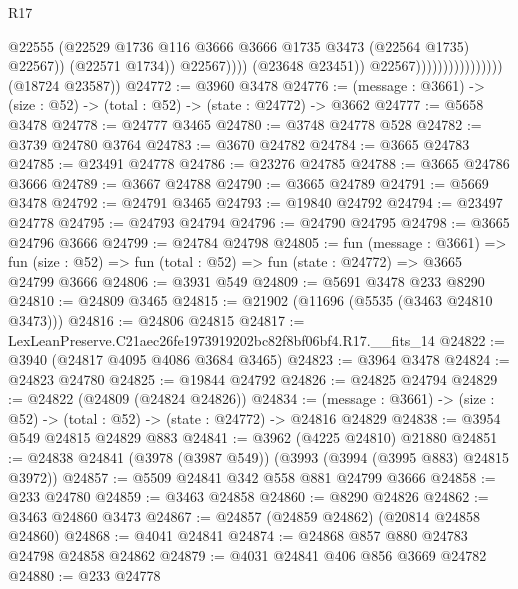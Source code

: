\begin{lexlean}{R17}
\begin{coremodule}
                                                    @22555
                                                    (@22529
                                                      @1736
                                                      @116
                                                      @3666
                                                      @3666
                                                      @1735
                                                      @3473
                                                      (@22564 @1735)
                                                      @22567))
                                                  (@22571 @1734))
                                                @22567))))
                                        (@23648 @23451))
                                      @22567))))))))))))))))
      (@18724 @23587))
@24772 := @3960 @3478
@24776 := (message : @3661) -> (size : @52) -> (total : @52) -> (state : @24772) -> @3662
@24777 := @5658 @3478
@24778 := @24777 @3465
@24780 := @3748 @24778 @528
@24782 := @3739 @24780 @3764
@24783 := @3670 @24782
@24784 := @3665 @24783
@24785 := @23491 @24778
@24786 := @23276 @24785
@24788 := @3665 @24786 @3666
@24789 := @3667 @24788
@24790 := @3665 @24789
@24791 := @5669 @3478
@24792 := @24791 @3465
@24793 := @19840 @24792
@24794 := @23497 @24778
@24795 := @24793 @24794
@24796 := @24790 @24795
@24798 := @3665 @24796 @3666
@24799 := @24784 @24798
@24805 := fun (message : @3661) =>
  fun (size : @52) => fun (total : @52) => fun (state : @24772) => @3665 @24799 @3666
@24806 := @3931 @549
@24809 := @5691 @3478 @233 @8290
@24810 := @24809 @3465
@24815 := @21902 (@11696 (@5535 (@3463 @24810 @3473)))
@24816 := @24806 @24815
@24817 := LexLeanPreserve.C21aec26fe1973919202bc82f8bf06bf4.R17.__fits_14
@24822 := @3940 (@24817 @4095 @4086 @3684 @3465)
@24823 := @3964 @3478
@24824 := @24823 @24780
@24825 := @19844 @24792
@24826 := @24825 @24794
@24829 := @24822 (@24809 (@24824 @24826))
@24834 := (message : @3661) -> (size : @52) -> (total : @52) -> (state : @24772) -> @24816 @24829
@24838 := @3954 @549 @24815 @24829 @883
@24841 := @3962 (@4225 @24810) @21880
@24851 := @24838 @24841 (@3978 (@3987 @549)) (@3993 (@3994 (@3995 @883) @24815 @3972))
@24857 := @5509 @24841 @342 @558 @881 @24799 @3666
@24858 := @233 @24780
@24859 := @3463 @24858
@24860 := @8290 @24826
@24862 := @3463 @24860 @3473
@24867 := @24857 (@24859 @24862) (@20814 @24858 @24860)
@24868 := @4041 @24841
@24874 := @24868 @857 @880 @24783 @24798 @24858 @24862
@24879 := @4031 @24841 @406 @856 @3669 @24782
@24880 := @233 @24778

\end{coremodule}
\end{lexlean}
